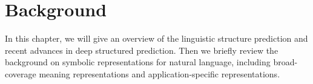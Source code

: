 
\chapter{Background}
\label{chap:background}

In this chapter, we will give an overview of the linguistic structure
prediction and recent advances in deep structured prediction.  Then we
briefly review the background on symbolic representations for natural
language, including broad-coverage meaning representations and
application-specific representations.






